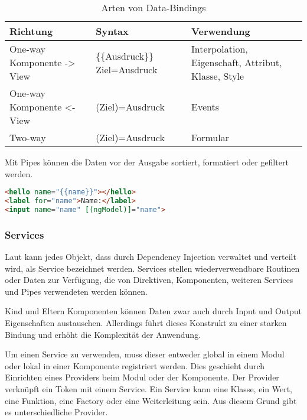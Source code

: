 \begin{table}
\begin{tabular}{|>{\raggedright\arraybackslash}p{3cm}|>{\raggedright\arraybackslash}p{3.2cm}|>{\raggedright\arraybackslash}p{7cm}|}
	\hline
	\textbf{Richtung}&\textbf{Syntax}&\textbf{Verwendung}\\
	\hline 
	One-way Komponente -> View &\{\{Ausdruck\}\} \lbrack Ziel\rbrack =\dq Ausdruck\dq  & Interpolation, Eigenschaft, Attribut, Klasse, Style\\ 
	\hline 
	One-way Komponente <- View &(Ziel)=\dq Ausdruck\dq&Events\\ 
	\hline 
	Two-way&\lbrack (Ziel)\rbrack =\dq Ausdruck\dq&Formular\\ 
	\hline 
\end{tabular}
\caption{Arten von Data-Bindings}
\label{tab:DataBinding}
\end{table}

Mit Pipes können die  Daten vor der Ausgabe sortiert, formatiert oder gefiltert werden. \autocite[vgl.][83\psqq]{Steyer.2017}

\begin{lstlisting}[caption=Das Template in der Datei app.component.html, label=lst:AppComponentHTML, language=HTML]
<hello name="{{name}}"></hello>
<label for="name">Name:</label>
<input name="name" [(ngModel)]="name">
\end{lstlisting}

\subsubsection{Services}
Laut \textcite[vgl.][474]{Freeman.2018} kann jedes Objekt, dass durch Dependency Injection verwaltet und verteilt wird, als Service bezeichnet werden. Services stellen wiederverwendbare Routinen oder Daten zur Verfügung, die von Direktiven, Komponenten, weiteren Services und Pipes verwendeten werden können. \autocites[vgl.][467\psqq]{Freeman.2018}[vgl.][89]{Steyer.2017}


Kind und Eltern Komponenten können Daten zwar auch durch Input und Output Eigenschaften austauschen. Allerdings führt dieses Konstrukt zu einer starken Bindung und erhöht die Komplexität der Anwendung.\autocite[vgl.][469]{Freeman.2018}

Um einen Service zu verwenden, muss dieser entweder global in einem Modul oder lokal in einer Komponente registriert werden. Dies geschieht durch Einrichten eines Providers beim Modul oder der Komponente. Der Provider verknüpft ein Token mit einem Service. Ein Service kann eine Klasse, ein Wert, eine Funktion, eine Factory oder eine Weiterleitung sein. Aus diesem Grund gibt es unterschiedliche Provider.

